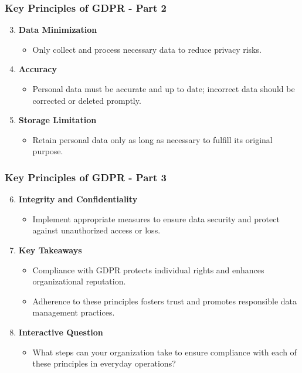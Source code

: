 \documentclass[aspectratio=169]{beamer}
\begin{document}
\begin{frame}[fragile]
    \frametitle{Key Principles of GDPR - Part 2}
    \begin{enumerate}
        \setcounter{enumi}{2}
        \item \textbf{Data Minimization}
        \begin{itemize}
            \item Only collect and process necessary data to reduce privacy risks.
        \end{itemize}
        
        \item \textbf{Accuracy}
        \begin{itemize}
            \item Personal data must be accurate and up to date; incorrect data should be corrected or deleted promptly.
        \end{itemize}
        
        \item \textbf{Storage Limitation}
        \begin{itemize}
            \item Retain personal data only as long as necessary to fulfill its original purpose.
        \end{itemize}
    \end{enumerate}
\end{frame}

\begin{frame}[fragile]
    \frametitle{Key Principles of GDPR - Part 3}
    \begin{enumerate}
        \setcounter{enumi}{5}
        \item \textbf{Integrity and Confidentiality}
        \begin{itemize}
            \item Implement appropriate measures to ensure data security and protect against unauthorized access or loss.
        \end{itemize}
        
        \item \textbf{Key Takeaways}
        \begin{itemize}
            \item Compliance with GDPR protects individual rights and enhances organizational reputation.
            \item Adherence to these principles fosters trust and promotes responsible data management practices.
        \end{itemize}
        
        \item \textbf{Interactive Question}
        \begin{itemize}
            \item What steps can your organization take to ensure compliance with each of these principles in everyday operations?
        \end{itemize}
    \end{enumerate}
\end{frame}
\end{document}
